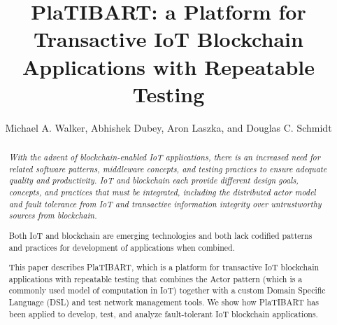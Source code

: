 \documentclass[sigconf]{acmart}
\newcommand{\AbhishekOld}[1]{}
\begin{document}
\setlength{\marginparwidth}{1.5cm}

 \title[PlaTIBART: a Platform for Transactive IoT Blockchain Applications with Repeatable Testing]{PlaTIBART: a Platform for Transactive IoT Blockchain Applications with Repeatable Testing}



\author{Michael A. Walker, Abhishek Dubey, Aron Laszka, and Douglas C. Schmidt}

\renewcommand{\shortauthors}{M. Walker et al.}


\begin{abstract}
{\em
With the advent of blockchain-enabled IoT applications, there is an increased need for related software patterns, middleware concepts, and testing practices to ensure adequate quality and productivity. IoT and blockchain each provide different design goals, concepts, and practices that must be integrated, including the distributed actor model and fault tolerance from IoT and transactive information integrity over untrustworthy sources from blockchain.
\AbhishekOld{for example, .. are we referring to distributed actor model and transactive information integrity over untrustworthy sources. It will be good to be precise}
Both IoT and blockchain are emerging technologies and both lack codified patterns and practices for development of applications when combined.
\AbhishekOld{This is first time we have used the world cyber-physical here}
This paper describes PlaTIBART, which is a platform for transactive IoT blockchain applications with repeatable testing that combines the Actor pattern (which is a commonly used model of computation in IoT\AbhishekOld{How does this relate to IoT, you can say a commonly used model of computation in IoT}) together with a custom Domain Specific Language (DSL) and test network management tools. We show how PlaTIBART has been applied to develop, test, and analyze fault-tolerant \AbhishekOld{Fault-tolerant is being described very late. you should describe this earlier as an example of the well-defined patterns} IoT blockchain applications.}

\end{abstract}
\end{document}
